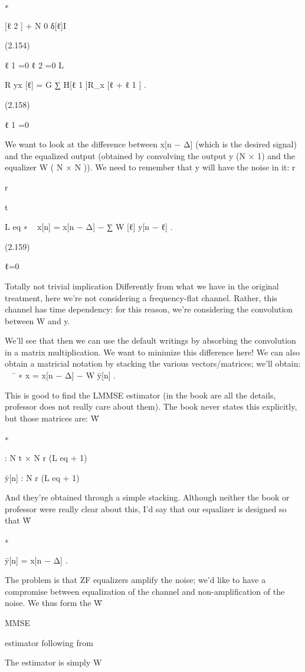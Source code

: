 {∗

[ℓ 2 ] + N 0 δ[ℓ]I

(2.154)

ℓ 1 =0 ℓ 2 =0 L

R yx [ℓ] = \sqrt G ∑ H[ℓ 1 ]R_x [ℓ + ℓ 1 ] .

(2.158)

ℓ 1 =0

We want to look at the difference between x[n − Δ] (which is the desired signal) and the equalized output (obtained by convolving the output y (N × 1) and the equalizer W (
N × N )). We need to remember that y will have the noise in it:
r

r

t

L eq
∗
~
x[n] = x[n − Δ] − ∑ W [ℓ] y[n − ℓ] .

(2.159)

ℓ=0

​Totally not trivial implication Differently from what we have in the original treatment, here we're not considering a frequency-flat channel. Rather, this channel has time dependency: for this reason,
we're considering the convolution between W and y.

We'll see that then we can use the default writings by absorbing the convolution in a matrix multiplication.
We want to minimize this difference here! We can also obtain a matricial notation by stacking the various vectors/matrices; we'll obtain:
~
¯ ∗
x = x[n − Δ] − W ȳ[n] .

This is good to find the LMMSE estimator (in the book are all the details, professor does not really care about them).
The book never states this explicitly, but those matrices are:
W̄

∗

: N t × N r (L eq + 1)

ȳ[n] : N r (L eq + 1)

And they're obtained through a simple stacking.
Although neither the book or professor were really clear about this, I'd say that our equalizer is designed so that W̄

∗

ȳ[n] = x[n − Δ] .

The problem is that ZF equalizers amplify the noise; we'd like to have a compromise between equalization of the channel and non-amplification of the noise.
We thus form the W̄

MMSE

estimator following from

The estimator is simply W

}
